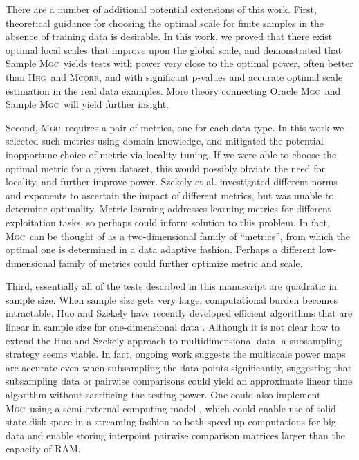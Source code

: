 \documentclass[11pt]{article}
\providecommand{\sct}[1]{{\normalfont\textsc{#1}}}
\newcommand{\Mgc}{\sct{Mgc}}
\newcommand{\Hhg}{\sct{Hhg}}
\newcommand{\Mcorr}{\sct{Mcorr}}
\begin{document}
There are a number of additional potential extensions of this work. First, theoretical guidance for choosing the optimal scale for finite samples in the absence of training data is desirable. 
In this work, we proved that there exist optimal local scales that improve upon the global scale, and demonstrated that Sample \Mgc~yields tests with power very close to the optimal power, often better than \Hhg~and \Mcorr, and with significant p-values and accurate optimal scale estimation in the real data examples. More theory connecting Oracle \Mgc~and  Sample \Mgc~will yield further insight.

Second, \Mgc~requires a pair of metrics, one for each data type. In this work we selected such metrics using domain knowledge, and mitigated the potential inopportune choice of metric via locality tuning.  If we were able to choose the optimal metric for a given dataset, this would possibly obviate the need for locality, and further improve power. Szekely et al. investigated different norms and exponents to ascertain the impact of different metrics, but was unable to determine optimality.
Metric learning \cite{xing2003distance} addresses learning metrics for different exploitation tasks, so perhaps could inform solution to this problem.
In fact, \Mgc~can be thought of as a two-dimensional family of ``metrics'', from which the optimal one is determined in a data adaptive fashion.  Perhaps a different low-dimensional family of metrics could further optimize metric and scale.

Third, essentially all of the tests described in this manuscript are quadratic in sample size.  When sample size gets very large, computational burden becomes intractable. Huo and Szekely have recently developed efficient algorithms that are linear in sample size for one-dimensional data \cite{Huo2016}.  Although it is not clear how to extend the Huo and Szekely approach to multidimensional data, a subsampling strategy seems viable. In fact, ongoing work suggests the multiscale power maps are accurate even when subsampling the data points significantly, suggesting that subsampling data or pairwise comparisons could yield an approximate linear time algorithm without sacrificing the testing power.  One could also implement \Mgc~using a semi-external computing model \cite{Zheng2016},  which could enable use of solid state disk space in a streaming fashion to both speed up computations for big data and enable storing interpoint pairwise comparison matrices larger than the capacity of RAM.
\end{document}
